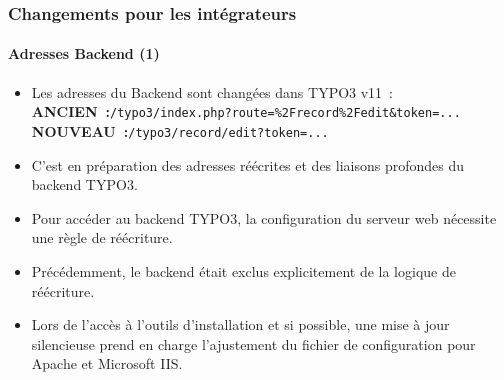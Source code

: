 %

\begin{frame}[fragile]
	\frametitle{Changements pour les intégrateurs}
	\framesubtitle{Adresses Backend (1)}

	\begin{itemize}
		\item Les adresses du Backend sont changées dans TYPO3 v11~:\newline
			\small
				\textbf{ANCIEN~:}\tabto{1.7cm}\texttt{/typo3/index.php?route=\%2Frecord\%2Fedit\&token=...}\newline
				\textbf{NOUVEAU~:}\tabto{1.7cm}\texttt{/typo3/record/edit?token=...}
			\normalsize

		\item C'est en préparation des adresses réécrites et des liaisons profondes du
			backend TYPO3.
		\item Pour accéder au backend TYPO3, la configuration du serveur web nécessite une règle de réécriture.
		\item Précédemment, le backend était exclus explicitement de la logique de réécriture.
		\item Lors de l'accès à l'outils d'installation et si possible, une mise à jour silencieuse prend
			en charge l'ajustement du fichier de configuration pour Apache et Microsoft IIS.

	\end{itemize}
\end{frame}


